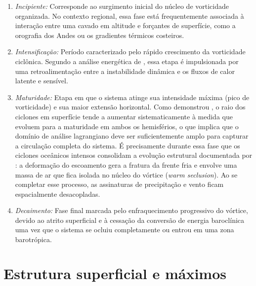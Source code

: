\begin{enumerate}
    \item \textit{Incipiente:} Corresponde ao surgimento inicial do núcleo de vorticidade organizada.
    No contexto regional, essa fase está frequentemente associada à interação entre uma cavado em altitude e forçantes de superfície, como a orografia dos Andes ou os gradientes térmicos costeiros.

    \item \textit{Intensificação:} Período caracterizado pelo rápido crescimento da vorticidade ciclônica.
    Segundo a análise energética de \citet{coutodesouza2024thesis}, essa etapa é impulsionada por uma retroalimentação entre a instabilidade dinâmica e os fluxos de calor latente e sensível.

    \item \textit{Maturidade:} Etapa em que o sistema atinge sua intensidade máxima (pico de vorticidade) e sua maior extensão horizontal. Como demonstrou \citet{simmonds2000size}, o raio dos ciclones em superfície tende a aumentar sistematicamente à medida que evoluem para a maturidade em ambos os hemisférios, o que implica que o domínio de análise lagrangiano deve ser suficientemente amplo para capturar a circulação completa do sistema.
    É precisamente durante essa fase que os ciclones oceânicos intensos consolidam a evolução estrutural documentada por \citet{shapiro1999bridge}: a deformação do escoamento gera a fratura da frente fria e envolve uma massa de ar que fica isolada no núcleo do vórtice (\textit{warm seclusion}).
    Ao se completar esse processo, as assinaturas de precipitação e vento ficam espacialmente desacopladas.

    \item \textit{Decaimento:} Fase final marcada pelo enfraquecimento progressivo do vórtice, devido ao atrito superficial e à cessação da conversão de energia baroclínica uma vez que o sistema se ocluiu completamente ou entrou em uma zona barotrópica.
\end{enumerate}


\section{Estrutura superficial e máximos}\label{sec:tb_compuestos}

